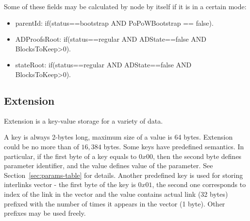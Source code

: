 \vspace{1em}
Some of these fields may be calculated by node by itself if it is in a certain mode:

\begin{itemize}
    \item parentId: if(status==bootstrap AND PoPoWBootstrap == false).
    \item ADProofsRoot: if(status==regular AND ADState==false AND BlocksToKeep>0).
    \item stateRoot: if(status==regular AND ADState==false AND BlocksToKeep>0).
\end{itemize}

\subsection{Extension}
\label{sec:extension}

Extension is a key-value storage for a variety of data.

A key is always 2-bytes long, maximum size of a value is 64 bytes. Extension could be no more than of $16,384$ bytes.
Some keys have predefined semantics. In particular, if the first byte of a key equals to $0x00$, then the second byte
defines parameter identifier, and the value defines value of the parameter. See Section~\ref{sec:params-table}
for details. Another predefined key is used for storing interlinks vector - the first byte of the key is $0x01$,
the second one corresponds to index of the link in the vector and the value contains actual link (32 bytes) prefixed
with the number of times it appears in the vector (1 byte). Other prefixes may be used freely.



